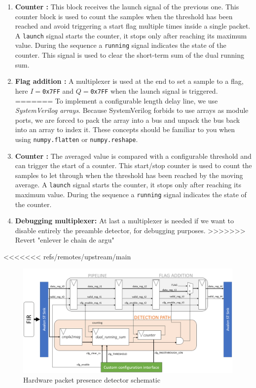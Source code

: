 \begin{enumerate}
\begin{enumerate}
    \item \textbf{Counter :} This block receives the launch signal of the previous one. This counter block is used to count the samples when the threshold has been reached and avoid triggering a start flag multiple times inside a single packet. A \texttt{launch} signal starts the counter, it stops only after reaching its maximum value. During the sequence a \texttt{running} signal indicates the state of the counter. This signal is used to clear the short-term sum of the dual running sum.

    \item \textbf{Flag addition :} A multiplexer is used at the end to set a sample to a flag, here $I=$\texttt{0x7FF} and $Q=$\texttt{0x7FF}  when the launch signal is triggered.
=======
    To implement a configurable length delay line, we use \textit{SystemVerilog arrays}. Because SystemVerilog forbids to use arrays as module ports, we are forced to pack the array into a bus and unpack the bus back into an array to index it. These concepts should be familiar to you when using \texttt{numpy.flatten} or \texttt{numpy.reshape}.

    \item \textbf{Counter :} The averaged value is compared with a configurable threshold and can trigger the start of a counter. This start/stop counter is used to count the samples to let through when the threshold has been reached by the moving average. A \texttt{launch} signal starts the counter, it stops only after reaching its maximum value. During the sequence a \texttt{running} signal indicates the state of the counter.

    \item \textbf{Debugging multiplexer: }At last a multiplexer is needed if we want to disable entirely the preamble detector, for debugging purposes.
>>>>>>> Revert "enlever le chain de argu"

\end{enumerate}


<<<<<<< refs/remotes/upstream/main
\begin{figure}[h]
    \centering
    \includegraphics[width=\linewidth]{figures/packet_presence_detection.png}
    \caption{Hardware packet presence detector schematic}
    \label{fig:pd_schematic}
\end{figure}


\end{enumerate}

